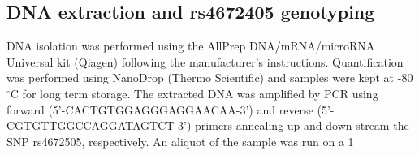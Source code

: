 

\subsection{DNA extraction and rs4672405 genotyping}
DNA isolation was performed using the AllPrep DNA/mRNA/microRNA Universal kit (Qiagen) following the manufacturer's instructions. Quantification was performed using NanoDrop (Thermo Scientific) and samples were kept at -80{$^\circ$}C for long term storage. The extracted DNA was amplified by PCR using forward (5'-CACTGTGGAGGGAGGAACAA-3') and reverse (5'-CGTGTTGGCCAGGATAGTCT-3') primers annealing up and down stream the SNP rs4672505, respectively. An aliquot of the sample was run on a 1%




